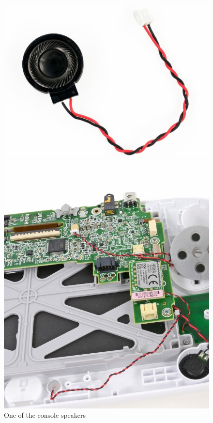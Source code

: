 \documentclass[11pt,a4paper,titlepage]{article}
\begin{document}
				\begin{figure}[h]
				  \begin{minipage}{.5 \textwidth}
						\centering
						\includegraphics[width = \textwidth]{speaker.png}
						\caption{One of the console speakers}
						\label{fig:speaker}
				  \end{minipage}
				  \vspace{5mm}
				  \begin{minipage}{.5 \textwidth}
						\centering
						\includegraphics[width = .8\textwidth]{buttons.png}

\end{minipage}
\end{figure}
\end{document}
